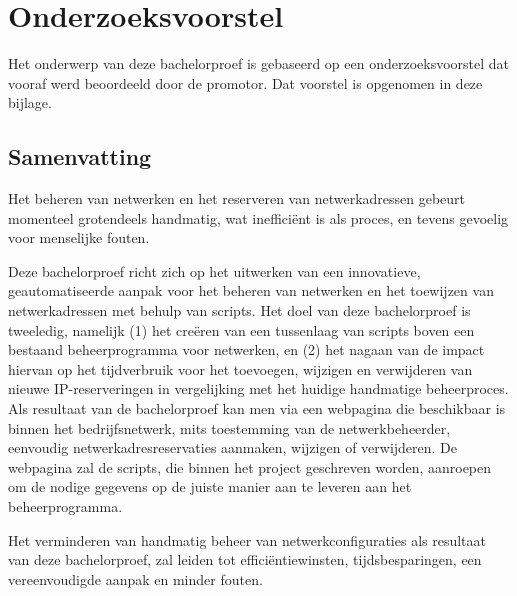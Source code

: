 \documentclass[dutch,dit,thesis]{hogentreport}
\begin{document}





%
%




\appendix

\chapter{Onderzoeksvoorstel}

Het onderwerp van deze bachelorproef is gebaseerd op een onderzoeksvoorstel dat vooraf werd beoordeeld door de promotor. Dat voorstel is opgenomen in deze bijlage.

\section*{Samenvatting}
Het beheren van netwerken en het reserveren van netwerkadressen gebeurt momenteel grotendeels handmatig, wat inefficiënt is als proces, en tevens gevoelig voor menselijke fouten. 

Deze bachelorproef richt zich op het uitwerken van een innovatieve, geautomatiseerde aanpak voor het beheren van netwerken en het
toewijzen van netwerkadressen met behulp van scripts. 
Het doel van deze bachelorproef is tweeledig, namelijk (1) het creëren van een tussenlaag van scripts boven een bestaand beheerprogramma voor netwerken, en (2) het nagaan van de impact hiervan op het tijdverbruik voor het toevoegen, wijzigen en verwijderen van nieuwe IP-reserveringen in vergelijking met het huidige handmatige beheerproces. Als resultaat van de bachelorproef kan men via een webpagina die beschikbaar is binnen het bedrijfsnetwerk, mits toestemming van de netwerkbeheerder, eenvoudig netwerkadresreservaties aanmaken, wijzigen of verwijderen.
De webpagina zal de scripts, die binnen het project geschreven worden, aanroepen om de nodige gegevens op de juiste manier aan te leveren aan het beheerprogramma. 

Het verminderen van handmatig beheer van netwerkconfiguraties als resultaat van deze bachelorproef, zal leiden tot efficiëntiewinsten, tijdsbesparingen, een vereenvoudigde aanpak en minder fouten.
\end{document}
